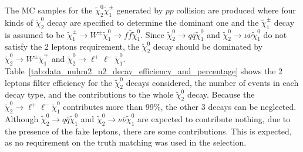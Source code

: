 The MC samples for the $\widetilde{\chi}^{0}_{2} \widetilde{\chi}^{\pm}_{1}$ generated by $pp$ collision are produced where four kinds of $\widetilde{\chi}^{0}_{2}$ decay are specified to determine the dominant one and the $\widetilde{\chi}^{\pm}_{1}$ decay is assumed to be $\widetilde{\chi}^{\pm}_{1} \to W^{\pm} \widetilde{\chi}^{0}_{1} \to f\bar{f} \widetilde{\chi}^{0}_{1}$.
Since $\widetilde{\chi}^{0}_{2} \to q\bar{q} \widetilde{\chi}^{0}_{1}$ and $\widetilde{\chi}^{0}_{2} \to \nu\bar{\nu} \widetilde{\chi}^{0}_{1}$ do not satisfy the 2 leptons requirement, the $\widetilde{\chi}^{0}_{2}$ decay should be dominated by $\widetilde{\chi}^{0}_{2} \to W^{\pm} \widetilde{\chi}^{\mp}_{1}$ and $\widetilde{\chi}^{0}_{2} \to \ell^{+}\ell^{-} \widetilde{\chi}^{0}_{1}$.
Table~\ref{tab:data_nuhm2_n2_decay_efficiency_and_percentage} shows the 2 leptons filter efficiency for the $\widetilde{\chi}^{0}_{2}$ decays considered, the number of events in each decay type, and the contributions to the whole $\widetilde{\chi}^{0}_{2}$ decay.
Because the $\tilde{\chi}^{0}_{2} \to \ell^{+} \ell^{-} \tilde{\chi}^{0}_{1}$ contributes more than 99\%, the other 3 decays can be neglected.
Although $\tilde{\chi}^{0}_{2} \to q \bar{q} \tilde{\chi}^{0}_{1}$ and $\tilde{\chi}^{0}_{2} \to \nu \bar{\nu} \tilde{\chi}^{0}_{1}$ are expected to contribute nothing, due to the presence of the fake leptons, there are some contributions.
This is expected, as no requirement on the truth matching was used in the selection.

